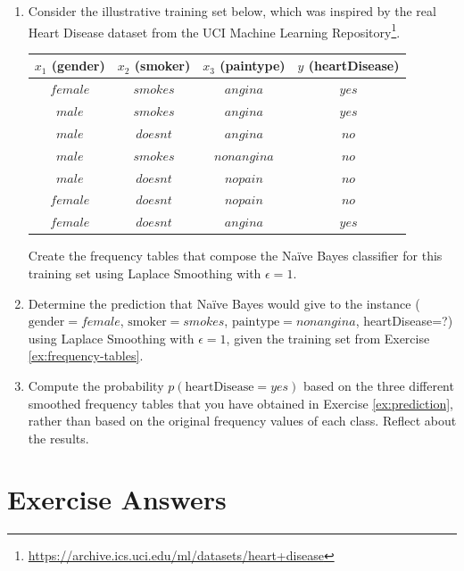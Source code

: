 \begin{enumerate}

\item \label{ex:frequency-tables} Consider the illustrative training set below, which was inspired by the real Heart Disease dataset from the UCI Machine Learning Repository\footnote{\url{https://archive.ics.uci.edu/ml/datasets/heart+disease}}.

\begin{center}
\begin{tabular}{|c|c|c||c|}\hline
$x_1$ (gender) & $x_2$ (smoker) & $x_3$ (paintype) & $y$ (heartDisease) \\ \hline
$female$ & $smokes$ & $angina$ & $yes$ \\ \hline
$male$ & $smokes$ & $angina$ & $yes$ \\ \hline
$male$ & $doesnt$ & $angina$ & $no$ \\ \hline
$male$ & $smokes$ & $nonangina$ & $no$ \\ \hline
$male$ & $doesnt$ & $nopain$ & $no$ \\ \hline
$female$ & $doesnt$ & $nopain$ & $no$ \\ \hline
$female$ & $doesnt$ & $angina$ & $yes$\\ \hline
\end{tabular} 
\end{center}

Create the frequency tables that compose the Na\"ive Bayes classifier for this training set using Laplace Smoothing with $\epsilon=1$. 

\item \label{ex:prediction} Determine the prediction that Na\"ive Bayes would give to the instance ($\text{gender}=female$, $\text{smoker}=smokes$, $\text{paintype}=nonangina$, heartDisease=?) using Laplace Smoothing with $\epsilon=1$, given the training set from Exercise \ref{ex:frequency-tables}.

\item \label{ex:laplace} Compute the probability $p(\text{heartDisease}=yes)$ based on the three different smoothed frequency tables that you have obtained in Exercise \ref{ex:prediction}, rather than based on the original frequency values of each class. Reflect about the results.

\end{enumerate}



\section{Exercise Answers}




